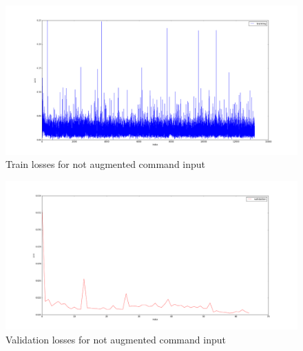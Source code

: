 \documentclass[a4paper]{article}
\begin{document}
\begin{minipage}{0.45\textwidth}
  \begin{figure}[H]
    \centering
    \includegraphics[width=\textwidth]{../pics/command_input_nonaugmented_training.png}
    \caption{Train losses for not augmented command input}
    \label{fig:non_augmented_train_loss}
  \end{figure}

\end{minipage}
\begin{minipage}{0.45\textwidth}
  \begin{figure}[H]
    \centering
    \includegraphics[width=\textwidth]{../pics/command_input_nonaugmented_validation.png}
    \caption{Validation losses for not augmented command input}
    \label{fig:non_augmented_val_loss}
  \end{figure}

\end{minipage}
\end{document}
